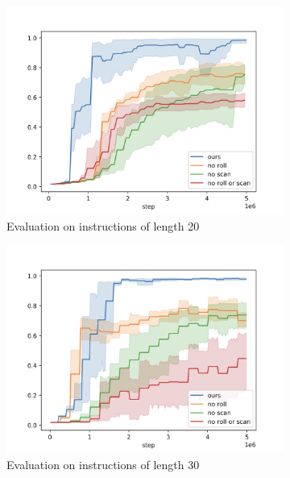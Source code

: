 \documentclass{article}
\begin{document}
\begin{figure}[th]
  \centering
  \begin{subfigure}{.33\textwidth}
    \centering
    \centerline{\includegraphics[width=\columnwidth]{figures/eval20}}
    \caption{Evaluation on instructions of length 20}
  \end{subfigure}%
  \begin{subfigure}{.33\textwidth}
    \centering
    \centerline{\includegraphics[width=\columnwidth]{figures/eval30}}
    \caption{Evaluation on instructions of length 30}
  \end{subfigure}%
  \begin{subfigure}{.33\textwidth}
    \centering

\end{subfigure}
\end{figure}
\end{document}
